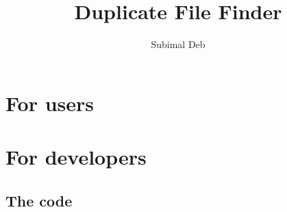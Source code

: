 \documentclass[a4paper,10pt]{book}
\title{Duplicate File Finder}
\author{Subimal Deb}
\date{}
\begin{document}
\maketitle
\tableofcontents

\part{For users}
\part{For developers}
\chapter{The code}


\end{document}
